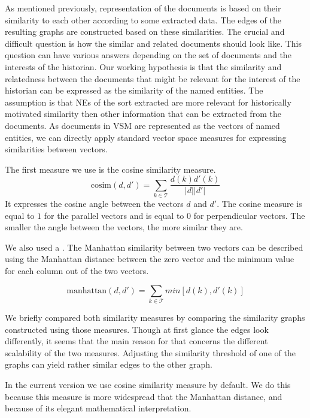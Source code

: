 
As mentioned previously, representation of the documents is based on their similarity to each other according to some extracted data. The edges of the resulting graphs are constructed based on these similarities. The crucial and difficult question is how the similar and related documents should look like. This question can have various answers depending on the set of documents and the interests of the historian. Our working hypothesis is that the similarity and relatedness between the documents that might be relevant for the interest of the historian can be expressed as the similarity of the named entities. 
The assumption is that NEs of the sort extracted are more relevant for historically motivated similarity then other information that can be extracted from the documents. As documents in VSM are represented as the vectors of named entities, we can directly apply standard vector space measures for expressing similarities between vectors. 

The first measure we use is the cosine similarity measure. 
\[\text{cosim}(d,d') = \sum_{k \in \mathcal{T}}\frac{d(k)d'(k)}{|d||d'|}\]
It expresses the cosine angle between the vectors $d$ and $d'$. The cosine measure is equal to $1$ for the parallel vectors and is equal to $0$ for perpendicular vectors. The smaller the angle between the vectors, the more similar they are.

We also used a . The Manhattan similarity between two vectors can be described using the Manhattan distance between the zero vector and the minimum value for each column out of the two vectors.

\[\text{manhattan}(d,d') = \sum_{k \in \mathcal{T}}min[d(k), d'(k)]\]

We briefly compared both similarity measures by comparing the similarity graphs constructed using those measures. Though at first glance the edges look differently, it seems that the main reason for that concerns the different scalability of the two measures. Adjusting the similarity threshold of one of the graphs can yield rather similar edges to the other graph.

In the current version we use cosine similarity measure by default. We do this because this measure is more widespread that the Manhattan distance, and because of its elegant mathematical interpretation.

